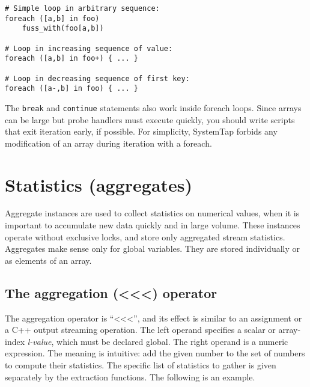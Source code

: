\documentclass[twoside,english]{article}
\newenvironment{vindent}
{\begin{list}{}{\setlength{\listparindent}{6pt}}
\item[]}
{\end{list}}
\begin{document}
\begin{vindent}
\begin{verbatim}
# Simple loop in arbitrary sequence:
foreach ([a,b] in foo)
    fuss_with(foo[a,b])

# Loop in increasing sequence of value:
foreach ([a,b] in foo+) { ... }

# Loop in decreasing sequence of first key:
foreach ([a-,b] in foo) { ... }
\end{verbatim}
\end{vindent}
The \texttt{break} and \texttt{continue} statements also work inside foreach
loops. Since arrays can be large but probe handlers must execute quickly,
you should write scripts that exit iteration early, if possible. For simplicity,
SystemTap forbids any modification of an array during iteration with a foreach.


\section{Statistics (aggregates)\label{sec:Statistics}}
Aggregate instances are used to collect statistics on numerical values, when
it is important to accumulate new data quickly and in large volume. These
instances operate without exclusive locks, and store only aggregated stream
statistics. Aggregates make sense only for global variables. They are stored
individually or as elements of an array.

\subsection{The aggregation (\textless\hspace{1 sp}\textless\hspace{1 sp}\textless) operator}
\index{\textless\hspace{1 sp}\textless\hspace{1 sp}\textless}
The aggregation operator is {}``\textless\hspace{1 sp}\textless\hspace{1 sp}\textless'',
and its effect is similar to an assignment or a C++ output streaming operation.
The left operand specifies a scalar or array-index \emph{l-value}, which
must be declared global. The right operand is a numeric expression. The meaning
is intuitive: add the given number to the set of numbers to compute their
statistics. The specific list of statistics to gather is given separately
by the extraction functions. The following is an example.
\end{document}
